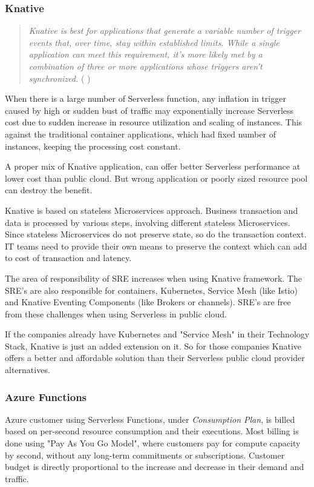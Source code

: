 \documentclass{article}
\begin{document}
\subsubsection{Knative}
\begin{quote}
    \textit{Knative is best for applications that generate a variable number of trigger events that, over time, stay within established limits. While a single application can meet this requirement, it's more likely met by a combination of three or more applications whose triggers aren't synchronized.}  ( \cite{Nolle_2020} )
\end{quote}
\par
\begin{flushleft}
When there is a large number of Serverless function, any inflation in trigger caused by high or sudden bust of traffic may exponentially increase Serverless cost due to sudden increase in resource utilization and scaling of instances. This against the traditional container applications, which had fixed number of instances, keeping the processing cost constant.
\par
A proper mix of Knative application, can offer better Serverless performance at lower cost than public cloud. But wrong application or poorly sized resource pool can destroy the benefit.
\par
Knative is based on stateless Microservices approach. Business transaction and data is processed by various steps, involving different stateless Microservices. Since stateless Microservices do not preserve state, so do the transaction context. IT teams need to provide their own means to preserve the context which can add to cost of transaction and latency.
\par
The area of responsibility of SRE increases when using Knative framework. The SRE's are also responsible for containers, Kubernetes, Service Mesh (like Istio) and Knative Eventing Components (like  Brokers or channels). SRE's are free from these challenges when using Serverless in public cloud.
\par
If the companies already have Kubernetes and "Service Mesh" in their Technology Stack, Knative is just an added extension on it. So for those companies Knative offers a better and affordable solution than their Serverless public cloud provider alternatives.
\par
\subsubsection{Azure Functions}
Azure customer using Serverless Functions, under \textit{Consumption Plan}, is billed based on per-second resource consumption and their executions. Most billing is done using "Pay As You Go Model", where customers pay for compute capacity by second, without any long-term commitments or subscriptions. Customer budget is directly proportional to the increase and decrease in their demand and traffic.
\par
 

\end{flushleft}
\end{document}
